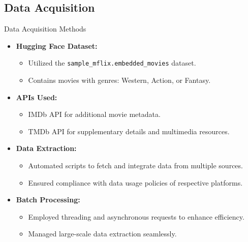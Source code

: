 \documentclass{beamer}
\begin{document}
\subsection{Data Acquisition}
\begin{frame}{Data Acquisition Methods}
  \begin{itemize}
    \item \textbf{Hugging Face Dataset:}
      \begin{itemize}
        \item Utilized the \texttt{sample\_mflix.embedded\_movies} dataset.
        \item Contains movies with genres: Western, Action, or Fantasy.
      \end{itemize}
    \item \textbf{APIs Used:}
      \begin{itemize}
        \item IMDb API for additional movie metadata.
        \item TMDb API for supplementary details and multimedia resources.
      \end{itemize}
    \item \textbf{Data Extraction:}
      \begin{itemize}
        \item Automated scripts to fetch and integrate data from multiple sources.
        \item Ensured compliance with data usage policies of respective platforms.
      \end{itemize}
    \item \textbf{Batch Processing:}
      \begin{itemize}
        \item Employed threading and asynchronous requests to enhance efficiency.
        \item Managed large-scale data extraction seamlessly.
      \end{itemize}
  \end{itemize}
\end{frame}

\end{document}
